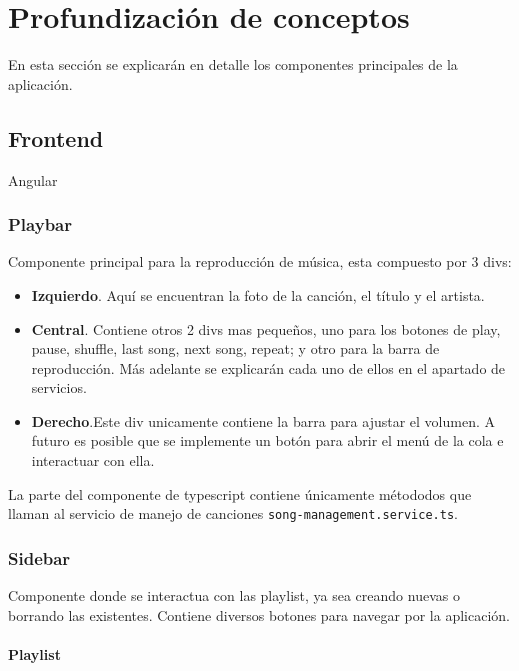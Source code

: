 \documentclass[11pt, a4paper]{article}
\begin{document}
\section{Profundización de conceptos}

En esta sección se explicarán en detalle los componentes principales de la aplicación.

        \subsection{Frontend}

        Angular

            \subsubsection{Playbar}

            Componente principal para la reproducción de música, esta compuesto por 3 divs:

            \begin{itemize}
                \item \textbf{Izquierdo}. Aquí se encuentran la foto de la canción, el título y el artista.
                \item \textbf{Central}. Contiene otros 2 divs mas pequeños, uno para los botones de play, pause, shuffle, last song, next song, repeat; y otro para la barra de reproducción. Más adelante se explicarán cada uno de ellos en el apartado de servicios.
                \item \textbf{Derecho}.Este div unicamente contiene la barra para ajustar el volumen. A futuro es posible que se implemente un botón para abrir el menú de la cola e interactuar con ella.
            \end{itemize}

            La parte del componente de typescript contiene únicamente métododos que llaman al servicio de manejo de canciones \verb|song-management.service.ts|.

            \subsubsection{Sidebar}

            Componente donde se interactua con las playlist, ya sea creando nuevas o borrando las existentes. Contiene diversos botones para navegar por la aplicación.

                \paragraph{Playlist}
                ‎ 
\end{document}
